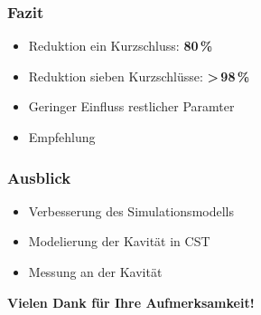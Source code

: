 \documentclass[accentcolor=tud9b, colorbacktitle, inverttitle]{tudbeamer}
\begin{document}
\begin{frame}\frametitle{Fazit}
\begin{itemize}
	\item Reduktion ein Kurzschluss: \textbf{80\,\%}
	\item Reduktion sieben Kurzschl\"usse:  \textbf{>\,98\,\%}
	\item Geringer Einfluss restlicher Paramter
	\item Empfehlung
\end{itemize}
\end{frame}

\begin{frame}\frametitle{Ausblick}
\begin{itemize}
	\item Verbesserung des Simulationsmodells
	\item Modelierung der Kavit\"at in CST
	\item Messung an der Kavit\"at
\end{itemize}
\end{frame}

\begin{frame}
\vspace{2cm}\hspace{2cm}
{\Large\bf Vielen Dank für Ihre Aufmerksamkeit!}
\end{frame}
% 	 
\end{document}
